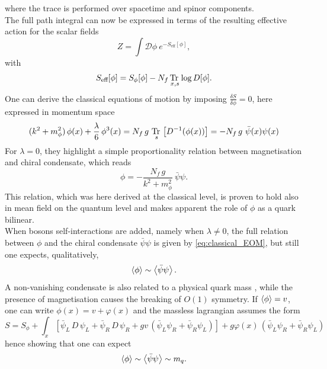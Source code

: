 where the trace is performed over spacetime and spinor components. \\ 
The full path integral can now be expressed in terms of the resulting effective action for the scalar fields
\begin{equation*}
    Z = \int \mathcal{D}\phi \ e^{-S_\text{eff}[\phi]},
\end{equation*}
with
\begin{equation}
    S_\text{eff}[\phi] = S_{\phi}[\phi] - N_f \, \underset{x,s}{\operatorname{\text{Tr} \,}} \log D[\phi].
    \label{eq:effective_action_no_fermions}
\end{equation}
One can derive the classical equations of motion by imposing $\frac{\delta S}{\delta \phi} = 0$, here expressed in momentum space
\begin{equation}
     (k^2 + m_\phi^2) \, \phi(x) + \frac{\lambda}{6} \, \phi^3(x) = N_f \, g \ \underset{s}{\tr} \left[D^{-1}(\phi(x))\right] = - N_f \, g \ \bar\psi(x) \psi(x)
     \label{eq:classical_EOM_full}
\end{equation}
For $\lambda = 0$, they highlight a simple proportionality relation between magnetisation and chiral condensate, which reads
\begin{equation}
    \phi = - \frac{N_f \, g}{k^2 + m_\phi^2} \ \bar \psi\psi.
    \label{eq:classical_EOM}
\end{equation}
This relation, which was here derived at the classical level, is proven to hold also in mean field on the quantum level \cite{Ayala2021QCDDescriptions} and makes apparent the role of $\phi$ as a quark bilinear. \\
When bosons self-interactions are added, namely when $\lambda \neq 0$, the full relation between $\phi$ and the chiral condensate $\bar\psi\psi$ is given by \eqref{eq:classical_EOM}, but still one expects, qualitatively,
\begin{equation}
    \left\langle \phi \right\rangle \sim \left\langle \bar\psi\psi \right\rangle.
    \label{eq:qualitative_relation_condensate_magnetisation}
\end{equation}
A non-vanishing condensate is also related to a physical quark mass \cite{Ayala2021QCDDescriptions,MANOHAR1984189}, while the presence of magnetisation causes the breaking of $O(1)$ symmetry.
If $\left\langle \phi \right\rangle = v$, one can write $\phi(x) = v + \varphi(x)$ and the massless lagrangian assumes the form 
\begin{equation*}
	S = S_\phi +  \int_x \left[\bar\psi_L \, D \, \psi_L + \bar\psi_R \, D \, \psi_R + gv \, \left(\bar\psi_L\psi_R + \bar\psi_R\psi_L\right)\right] + g\varphi(x) \, \left(\bar\psi_L\psi_R + \bar\psi_R\psi_L\right)
\end{equation*}
hence showing that one can expect
\begin{equation}
    \left\langle \phi \right\rangle \sim \left\langle \bar\psi\psi \right\rangle \sim m_q.
    \label{eq:qualitative_relation_condensate_magnetisation_mass}
\end{equation}

